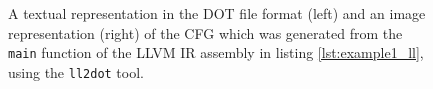 \begin{figure}[htbp]
\begin{subfigure}[ht]{0.20\textwidth}
	\end{subfigure}
	\caption{A textual representation in the DOT file format (left) and an image representation (right) of the CFG which was generated from the \texttt{main} function of the LLVM IR assembly in listing \ref{lst:example1_ll}, using the \texttt{ll2dot} tool.}
	\label{fig:example1_unstructured_cfg}
\end{figure}
